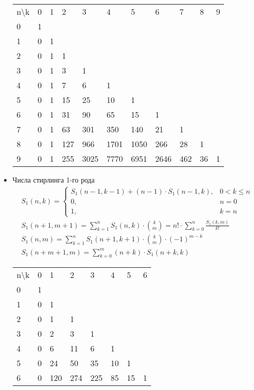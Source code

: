 \documentclass[10pt]{article}
\begin{document}
\begin{itemize}
\begin{longtable}[c]{lllllllllll}
n\textbackslash{}k & 0 & 1 & 2 & 3 & 4 & 5 & 6 & 7 & 8 & 9
\\
0 & 1 & & & & & & & & &
\\
1 & 0 & 1 & & & & & & & &
\\
2 & 0 & 1 & 1 & & & & & & &
\\
3 & 0 & 1 & 3 & 1 & & & & & &
\\
4 & 0 & 1 & 7 & 6 & 1 & & & & &
\\
5 & 0 & 1 & 15 & 25 & 10 & 1 & & & &
\\
6 & 0 & 1 & 31 & 90 & 65 & 15 & 1 & & &
\\
7 & 0 & 1 & 63 & 301 & 350 & 140 & 21 & 1 & &
\\
8 & 0 & 1 & 127 & 966 & 1701 & 1050 & 266 & 28 & 1 &
\\
9 & 0 & 1 & 255 & 3025 & 7770 & 6951 & 2646 & 462 & 36 & 1
\\

\end{longtable}
\item Числа стирлинга 1-го рода
\begin{equation}
  \begin{split}
    &S_1(n, k) = 
    \left\{
    \begin{array}{cc}
    S_1(n-1, k-1) + (n - 1) \cdot S_1(n-1, k), & 0 < k \le n\\
    0, & n = 0\\
    1, & k = n
    \end{array}
    \right.\\
    &S_1(n + 1, m + 1) = \sum\limits_{k = 1}^n S_1(n, k) \cdot \binom{k}{m} = n! \cdot \sum\limits_{k=0}^n\frac{S_1(k, m)}{k!}\\
    &S_1(n, m) = \sum\limits_{k=1}^n S_1(n + 1, k + 1) \cdot \binom{k}{m} \cdot (-1)^{m - k}\\
    &S_1(n + m + 1, m) = \sum\limits_{k=0}^m (n + k) \cdot S_1(n + k, k)
  \end{split}
\end{equation}
\begin{longtable}[c]{llllllll}

n\textbackslash{}k & 0 & 1 & 2 & 3 & 4 & 5 & 6
\\

0 & 1 & & & & & &
\\
1 & 0 & 1 & & & & &
\\
2 & 0 & 1 & 1 & & & &
\\
3 & 0 & 2 & 3 & 1 & & &
\\
4 & 0 & 6 & 11 & 6 & 1 & &
\\
5 & 0 & 24 & 50 & 35 & 10 & 1 &
\\
6 & 0 & 120 & 274 & 225 & 85 & 15 & 1
\\


\end{longtable}
\end{itemize}
\end{document}
